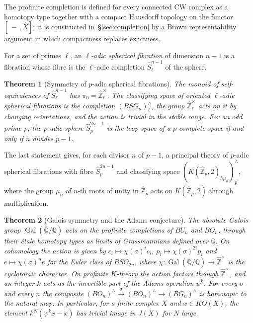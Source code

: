 \documentclass[11pt]{amsart}
\theoremstyle{plain}
\newtheorem{theoremA}{Theorem}
\theoremstyle{definition}
\numberwithin{equation}{section}
\newcommand{\Q}{\mathbb{Q}}
\newcommand{\Zhat}{\widehat{\mathbb{Z}}}
\newcommand{\Qbar}{\overline{\mathbb{Q}}}
\newcommand{\KO}{\mathit{KO}}
\newcommand{\hX}{\widehat{X}}
\newcommand{\units}{^{\times}}
\DeclareMathOperator{\Gal}{Gal}
\begin{document}
The profinite completion is defined for every connected CW complex as a homotopy type together with a compact Hausdorff topology on the functor $[\,-\,,\hX]$; it is constructed in~\S\ref{sec:completion} by a Brown representability argument in which compactness replaces exactness.

For a set of primes $\ell$, an \emph{$\ell$-adic spherical fibration} of dimension $n-1$ is a fibration whose fibre is the $\ell$-adic completion $\widehat S^{n-1}_\ell$ of the sphere.

\begin{theoremA}[Symmetry of $p$-adic spherical fibrations]\label{thm:B}
The monoid of self-equivalences of $\widehat S^{n-1}_\ell$ has $\pi_0=\Zhat_\ell\units$.
The classifying space of oriented $\ell$-adic spherical fibrations is the completion $(BSG_n)^\wedge_\ell$, the group $\Zhat_\ell\units$ acts on it by changing orientations, and the action is trivial in the stable range.
For an odd prime $p$, the $p$-adic sphere $\widehat S^{2n-1}_p$ is the loop space of a $p$-complete space if and only if $n$ divides $p-1$.
\end{theoremA}

The last statement gives, for each divisor $n$ of $p-1$, a principal theory of $p$-adic spherical fibrations with fibre $\widehat S^{2n-1}_p$ and classifying space $(K(\Zhat_p,2)_{h\mu_n})^\wedge_p$, where the group $\mu_n$ of $n$-th roots of unity in $\Zhat_p$ acts on $K(\Zhat_p,2)$ through multiplication.

\begin{theoremA}[Galois symmetry and the Adams conjecture]\label{thm:C}
The absolute Galois group $\Gal(\Qbar/\Q)$ acts on the profinite completions of $BU_n$ and $BO_n$, through their \'etale homotopy types as limits of Grassmannians defined over $\Q$.
On cohomology the action is given by $c_i\mapsto\chi(\sigma)^ic_i$, $p_i\mapsto\chi(\sigma)^{2i}p_i$ and $e\mapsto\chi(\sigma)^ne$ for the Euler class of $BSO_{2n}$, where $\chi\colon\Gal(\Qbar/\Q)\to\Zhat\units$ is the cyclotomic character.
On profinite $K$-theory the action factors through $\Zhat\units$, and an integer $k$ acts as the invertible part of the Adams operation $\psi^k$.
For every $\sigma$ and every $n$ the composite $(BO_n)^\wedge\xrightarrow{\sigma}(BO_n)^\wedge\to(BG_n)^\wedge$ is homotopic to the natural map.
In particular, for a finite complex $X$ and $x\in\KO(X)$, the element $k^N(\psi^kx-x)$ has trivial image in $J(X)$ for $N$ large.
\end{theoremA}
\end{document}
